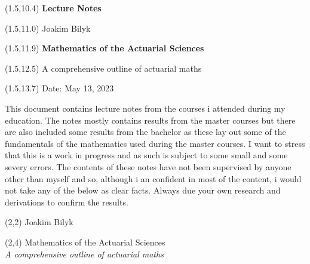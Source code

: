 \documentclass[a4paper,10pt,openany]{book}
\begin{document}
\thispagestyle{empty}

\begin{textblock}{12}(1.5,10.4) \noindent\fontsize{20}{20}\selectfont \textbf{Lecture Notes}
\end{textblock}

\begin{textblock}{12}(1.5,11.0) \noindent\fontsize{14}{14}\selectfont Joakim Bilyk
\end{textblock}

\begin{textblock}{12}(1.5,11.9)
\noindent\fontsize{20}{20}\selectfont \textbf{Mathematics of the Actuarial Sciences}
\end{textblock}

\begin{textblock}{12}(1.5,12.5)
    \noindent\fontsize{14}{14}\selectfont A comprehensive outline of actuarial maths
\end{textblock}

\begin{textblock}{12}(1.5,13.7)
\noindent\fontsize{11}{11}\selectfont Date: May 13, 2023
\end{textblock}

\hspace{1pt}
\newpage

\onehalfspacing
\thispagestyle{empty}
\noindent

This document contains lecture notes from the courses i attended during my education. The notes mostly contains results from the master courses but there are also included some results from the bachelor as these lay out some of the fundamentals of the mathematics used during the master courses. I want to stress that this is a work in progress and as such is subject to some small and some severy errors. The contents of these notes have not been supervised by anyone other than myself and so, although i an confident in most of the content, i would not take any of the below as clear facts. Always due your own research and derivations to confirm the results.

\newpage

\thispagestyle{empty}

\begin{textblock}{12}(2,2)
\noindent\fontsize{20}{20}\selectfont Joakim Bilyk
\end{textblock}

\begin{textblock}{12}(2,4)
\noindent\fontsize{35pt}{40pt}\selectfont Mathematics of the Actuarial Sciences\\
\fontsize{20pt}{40pt}\selectfont \emph{A comprehensive outline of actuarial maths}
\end{textblock}
\end{document}
